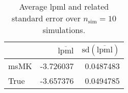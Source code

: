 \begin{table}[H]

\caption{Average lpml and related standard error over $n_{\text{sim}} = 10$ simulations.}
\centering
\begin{tabular}[t]{lrr}
\toprule
  & $\overbar{\text{lpml}}$ & $\text{sd}(\overbar{\text{lpml}})$\\
\midrule
msMK & -3.726037 & 0.0487483\\
True & -3.657376 & 0.0494785\\
\bottomrule
\end{tabular}
\end{table}